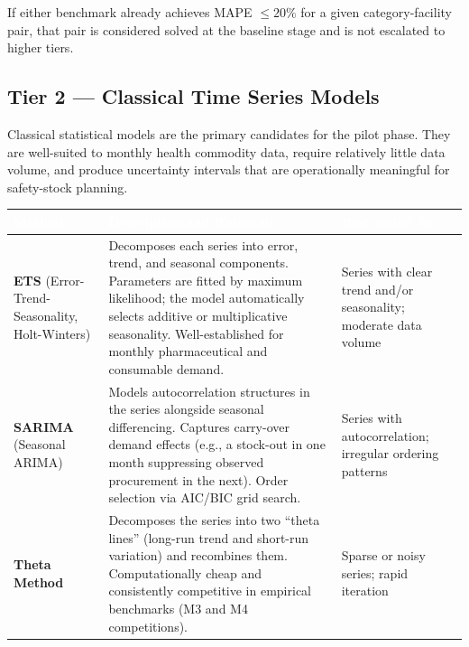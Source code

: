 \documentclass[12pt, a4paper]{article}
\begin{document}
If either benchmark already achieves MAPE $\leq 20\%$ for a given
category-facility pair, that pair is considered solved at the baseline stage
and is not escalated to higher tiers.

\subsection{Tier 2 --- Classical Time Series Models}

Classical statistical models are the primary candidates for the pilot phase.
They are well-suited to monthly health commodity data, require relatively
little data volume, and produce uncertainty intervals that are operationally
meaningful for safety-stock planning.

\vspace{0.8em}
\noindent
\begin{tabularx}{\textwidth}{@{} L{3.6cm} X L{3.2cm} @{}}
  \toprule
  \textcolor{white}{\textbf{Method}} &
  \textcolor{white}{\textbf{Description and Rationale}} &
  \textcolor{white}{\textbf{Best suited for}} \\
  \midrule

  \textbf{ETS} \newline
  (Error-Trend-Seasonality, \newline Holt-Winters)
  &
  Decomposes each series into error, trend, and seasonal components.
  Parameters are fitted by maximum likelihood; the model automatically
  selects additive or multiplicative seasonality. Well-established for
  monthly pharmaceutical and consumable demand.
  &
  Series with clear trend and/or seasonality; moderate data volume \\

  \addlinespace[4pt]

  \textbf{SARIMA} \newline
  (Seasonal ARIMA)
  &
  Models autocorrelation structures in the series alongside seasonal
  differencing. Captures carry-over demand effects (e.g., a stock-out in
  one month suppressing observed procurement in the next). Order selection
  via AIC/BIC grid search.
  &
  Series with autocorrelation; irregular ordering patterns \\

  \addlinespace[4pt]

  \textbf{Theta Method}
  &
  Decomposes the series into two ``theta lines'' (long-run trend and
  short-run variation) and recombines them. Computationally cheap and
  consistently competitive in empirical benchmarks (M3 and M4
  competitions).
  &
  Sparse or noisy series; rapid iteration \\

  \bottomrule
\end{tabularx}
\end{document}
